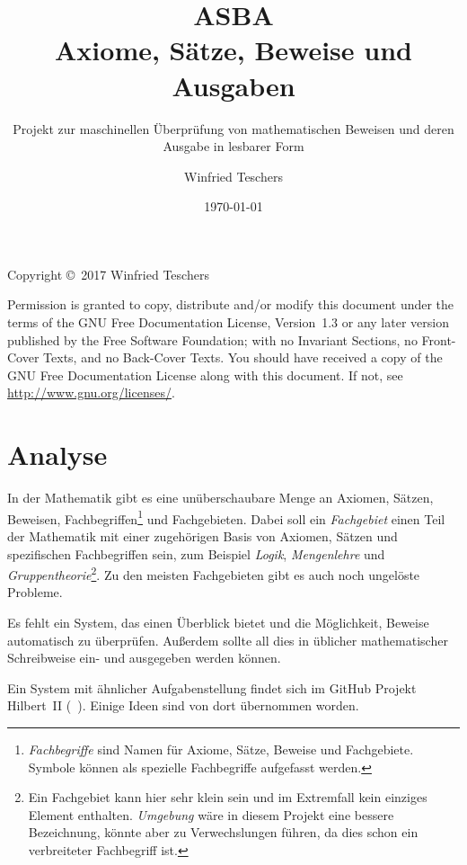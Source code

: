\documentclass[english,ngerman,parskip=half,headsepline,footsepline]{scrreprt}
\title{{\Huge ASBA}\\Axiome, Sätze, Beweise und Ausgaben}
\subtitle{Projekt zur maschinellen Überprüfung von mathematischen Beweisen und deren Ausgabe in lesbarer Form}
\author{Winfried Teschers}
\date{\today}
\begin{document}
	\maketitle

	\tableofcontents
	\ihead{\textnormal{\textsf{\textbf{\contentsname}}}}
	\thispagestyle{scrheadings}

	\vfill
	Copyright \copyright\ 2017 Winfried Teschers

	\bigskip
	Permission is granted to copy, distribute and/or modify this document under the terms of the GNU Free Documentation License, Version~1.3 or any later version published by the Free Software Foundation; with no Invariant Sections, no Front-Cover Texts, and no Back-Cover Texts. You should have received a copy of the GNU Free Documentation License along with this document.  If not, see \url{http://www.gnu.org/licenses/}.

	\chapter{Analyse} %

	\ihead{\textnormal{\textsf{\textbf{\chaptername~\thesection}}}}
	\thispagestyle{scrheadings}

	In der Mathematik gibt es eine unüberschaubare Menge an Axiomen, Sätzen, Beweisen, Fachbegriffen\footnote{ \emph{Fachbegriffe} sind Namen für Axiome, Sätze, Beweise und Fachgebiete. Symbole können als spezielle Fachbegriffe aufgefasst werden.} und Fachgebieten. Dabei soll ein \emph{Fachgebiet} einen Teil der Mathematik  mit einer zugehörigen Basis von Axiomen, Sätzen und spezifischen Fachbegriffen sein, zum Beispiel \emph{Logik}, \emph{Mengenlehre} und \emph{Gruppentheorie}\footnote{ Ein Fachgebiet kann hier sehr klein sein und im Extremfall kein einziges Element enthalten. \emph{Umgebung} wäre in diesem Projekt eine bessere Bezeichnung, könnte aber zu Verwechslungen führen, da dies schon ein verbreiteter Fachbegriff ist.}. Zu den meisten Fachgebieten gibt es auch noch ungelöste Probleme.

	Es fehlt ein System, das einen Überblick bietet und die Möglichkeit, Beweise automatisch zu überprüfen. Außerdem sollte all dies in üblicher mathematischer Schreibweise ein- und ausgegeben werden können.

	Ein System mit ähnlicher Aufgabenstellung findet sich im GitHub Projekt Hilbert~II (\seename~\cite{bib:HilbertII, bib:qedeq}). Einige Ideen sind von dort übernommen worden.
\end{document}
